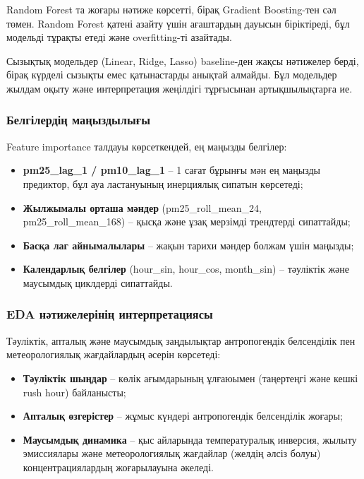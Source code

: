 \documentclass[12pt,a4paper]{article}
\begin{document}
Random Forest та жоғары нәтиже көрсетті, бірақ Gradient Boosting-тен сәл төмен. Random Forest қатені азайту үшін ағаштардың дауысын біріктіреді, бұл модельді тұрақты етеді және overfitting-ті азайтады.

Сызықтық модельдер (Linear, Ridge, Lasso) baseline-ден жақсы нәтижелер берді, бірақ күрделі сызықты емес қатынастарды анықтай алмайды. Бұл модельдер жылдам оқыту және интерпретация жеңілдігі тұрғысынан артықшылықтарға ие.

\subsubsection{Белгілердің маңыздылығы}

Feature importance талдауы көрсеткендей, ең маңызды белгілер:
\begin{itemize}
\item \textbf{pm25\_lag\_1 / pm10\_lag\_1} – 1 сағат бұрынғы мән ең маңызды предиктор, бұл ауа ластануының инерциялық сипатын көрсетеді;
\item \textbf{Жылжымалы орташа мәндер} (pm25\_roll\_mean\_24, pm25\_roll\_mean\_168) – қысқа және ұзақ мерзімді трендтерді сипаттайды;
\item \textbf{Басқа лаг айнымалылары} – жақын тарихи мәндер болжам үшін маңызды;
\item \textbf{Календарлық белгілер} (hour\_sin, hour\_cos, month\_sin) – тәуліктік және маусымдық циклдерді сипаттайды.
\end{itemize}

\subsubsection{EDA нәтижелерінің интерпретациясы}

Тәуліктік, апталық және маусымдық заңдылықтар антропогендік белсенділік пен метеорологиялық жағдайлардың әсерін көрсетеді:
\begin{itemize}
\item \textbf{Тәуліктік шыңдар} – көлік ағымдарының ұлғаюымен (таңертеңгі және кешкі rush hour) байланысты;
\item \textbf{Апталық өзгерістер} – жұмыс күндері антропогендік белсенділік жоғары;
\item \textbf{Маусымдық динамика} – қыс айларында температуралық инверсия, жылыту эмиссиялары және метеорологиялық жағдайлар (желдің әлсіз болуы) концентрациялардың жоғарылауына әкеледі.
\end{itemize}
\end{document}
